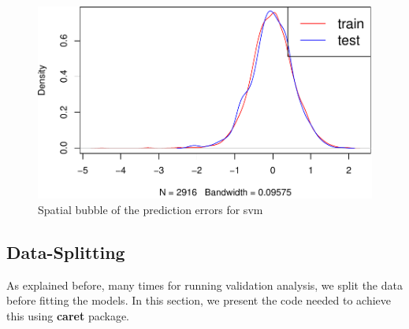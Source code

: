 \documentclass[10pt,b5paper,]{book}
\newenvironment{Shaded}{\begin{snugshade}}{\end{snugshade}}
\newcommand{\CommentTok}[1]{\textcolor[rgb]{0.56,0.35,0.01}{\textit{#1}}}
\newcommand{\DataTypeTok}[1]{\textcolor[rgb]{0.13,0.29,0.53}{#1}}
\newcommand{\DecValTok}[1]{\textcolor[rgb]{0.00,0.00,0.81}{#1}}
\newcommand{\KeywordTok}[1]{\textcolor[rgb]{0.13,0.29,0.53}{\textbf{#1}}}
\newcommand{\NormalTok}[1]{#1}
\newcommand{\OperatorTok}[1]{\textcolor[rgb]{0.81,0.36,0.00}{\textbf{#1}}}
\newcommand{\StringTok}[1]{\textcolor[rgb]{0.31,0.60,0.02}{#1}}
\theoremstyle{definition}
\theoremstyle{definition}
\theoremstyle{definition}
\theoremstyle{remark}
\begin{document}
\begin{Shaded}
\end{Shaded}

\begin{figure}
\includegraphics[width=0.6\linewidth]{SOCMapping_files/figure-latex/unnamed-chunk-91-1} \caption{Spatial bubble of the prediction errors for svm}\label{fig:unnamed-chunk-91}
\end{figure}

\hypertarget{dataSplit}{%
\subsection{Data-Splitting}\label{dataSplit}}

As explained before, many times for running validation analysis, we
split the data before fitting the models. In this section, we present
the code needed to achieve this using \textbf{caret} package.
\end{document}
